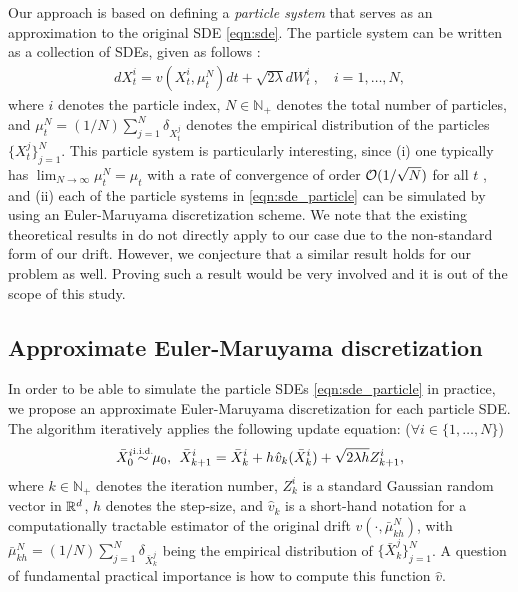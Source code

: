 Our approach is based on defining a \emph{particle system} that serves as an approximation to the original SDE \eqref{eqn:sde}. The particle system can be written as a collection of SDEs, given as follows \cite{bossy1997stochastic}:
\begin{align}
d X_t^i = v(X_t^i, \mu_t^{N}) dt + \sqrt{2 \lambda } d W_t^i \> , \quad i = 1,\dots, N, \label{eqn:sde_particle}
\end{align}
where $i$ denotes the particle index, $N \in \mathbb{N}_+$ denotes the total number of particles, and $\mu_t^N = (1/N) \sum_{j=1}^N \delta_{X_t^j}$ denotes the empirical distribution of the particles $\{X_t^j\}_{j=1}^N$. This particle system is particularly interesting, since (i) one typically has $\lim_{N \rightarrow \infty} \mu_t^{N}= \mu_t $ with a rate of convergence of order ${\cal O}(1/\sqrt{N})$ for all $t$ \cite{malrieu03,cgm-08}, and (ii) each of the particle systems in \eqref{eqn:sde_particle} can be simulated by using an Euler-Maruyama discretization scheme. We note that the existing theoretical results in \cite{veretennikov2006ergodic,mishura2016existence} do not directly apply to our case due to the non-standard form of our drift. However, we conjecture that a similar result holds for our problem as well. Proving such a result would be very involved and it is out of the scope of this study. 

\subsection{Approximate Euler-Maruyama discretization}
%
In order to be able to simulate the particle SDEs \eqref{eqn:sde_particle} in practice, we propose an approximate Euler-Maruyama discretization for each particle SDE.
The algorithm iteratively applies the following update equation: ($\forall i \in  \{1,\dots,N\}$)
% 
\begin{align}
\bar{X}^i_0 \simiid \mu_0, \>\> \bar{X}^i_{k+1} = \bar{X}^i_k + h \hspace{0.5pt} \hat{v}_k(\bar{X}^i_k) + \sqrt{2 \lambda h} Z^i_{k+1}, \label{eqn:euler_particle}
\end{align}
where $k \in \mathbb{N}_+$ denotes the iteration number, $Z^i_k$ is a standard Gaussian random vector in $\mathbb{R}^d$, $h$ denotes the step-size, and $\hat{v}_k$ is a short-hand notation for a computationally tractable estimator of the original drift $v(\cdot, \bar{\mu}_{kh}^N)$, with $\bar{\mu}_{kh}^{N} = (1/N) \sum_{j=1}^N \delta_{\bar{X}_k^j}$ being the empirical distribution of $\{\bar{X}_k^j\}_{j=1}^N$. A question of fundamental practical importance is how to compute this function $\hat{v}$.

